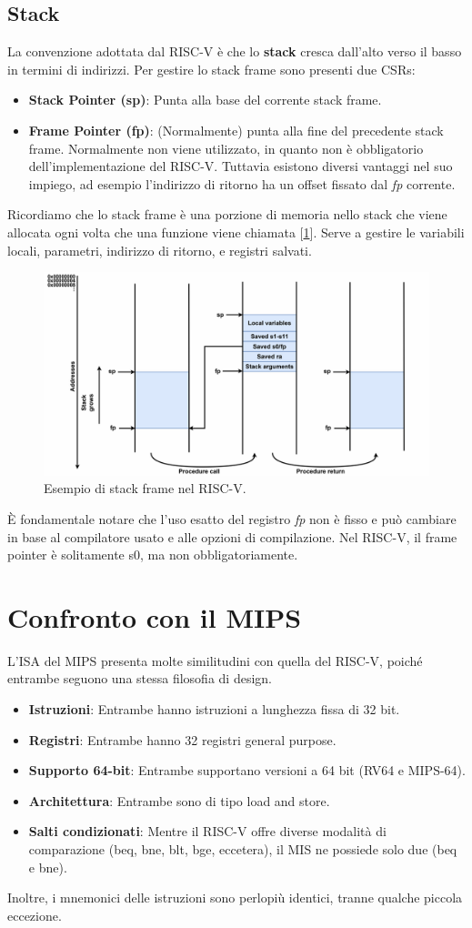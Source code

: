 \subsection{Stack}
La convenzione adottata dal RISC-V è che lo \textbf{stack} cresca dall'alto verso il basso in termini di indirizzi. Per gestire lo stack frame sono presenti due CSRs:
\begin{itemize}
	\item \textbf{Stack Pointer (sp)}: Punta alla base del corrente stack frame.
	\item \textbf{Frame Pointer (fp)}: (Normalmente) punta alla fine del precedente stack frame. Normalmente non viene utilizzato, in quanto non è obbligatorio dell'implementazione del RISC-V. Tuttavia esistono diversi vantaggi nel suo impiego, ad esempio l'indirizzo di ritorno ha un offset fissato dal \textit{fp} corrente.
\end{itemize}
Ricordiamo che lo stack frame è una porzione di memoria nello stack che viene allocata ogni volta che una funzione viene chiamata [\ref{fig:stack-frame}]. Serve a gestire le variabili locali, parametri, indirizzo di ritorno, e registri salvati.
\begin{figure}[!h]
	\centering
	\includegraphics[width=0.6\linewidth]{img/stack-frame}
	\caption{Esempio di stack frame nel RISC-V.}
	\label{fig:stack-frame}
\end{figure}
\MakeUppercase{è} fondamentale notare che l'uso esatto del registro \textit{fp} non è fisso e può cambiare in base al compilatore usato e alle opzioni di compilazione. Nel RISC-V, il frame pointer è solitamente s0, ma non obbligatoriamente.

\section{Confronto con il MIPS}
L'ISA del MIPS presenta molte similitudini con quella del RISC-V, poiché entrambe seguono una stessa filosofia di design.
\begin{itemize}
	\item \textbf{Istruzioni}: Entrambe hanno istruzioni a lunghezza fissa di 32 bit.
	\item \textbf{Registri}: Entrambe hanno 32 registri general purpose.
	\item \textbf{Supporto 64-bit}: Entrambe supportano versioni a 64 bit (RV64 e MIPS-64).
	\item \textbf{Architettura}: Entrambe sono di tipo load and store.
	\item \textbf{Salti condizionati}: Mentre il RISC-V offre diverse modalità di comparazione (beq, bne, blt, bge, eccetera), il MIS ne possiede solo due (beq e bne).
\end{itemize}
Inoltre, i mnemonici delle istruzioni sono perlopiù identici, tranne qualche piccola eccezione.